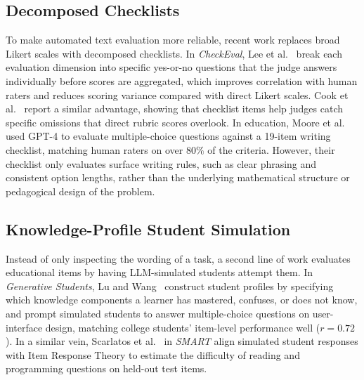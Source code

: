 \subsection{Decomposed Checklists}
\label{subsec:bg-eval-checklists}
To make automated text evaluation more reliable, recent work replaces broad Likert scales with decomposed checklists. In \emph{CheckEval}, Lee et al.~\cite{lee2025checkeval} break each evaluation dimension into specific yes-or-no questions that the judge answers individually before scores are aggregated, which improves correlation with human raters and reduces scoring variance compared with direct Likert scales. Cook et al.~\cite{cook2024tick} report a similar advantage, showing that checklist items help judges catch specific omissions that direct rubric scores overlook. In education, Moore et al.~\cite{moore2023mcqquality} used GPT-4 to evaluate multiple-choice questions against a 19-item writing checklist, matching human raters on over $80\%$ of the criteria. However, their checklist only evaluates surface writing rules, such as clear phrasing and consistent option lengths, rather than the underlying mathematical structure or pedagogical design of the problem.

\subsection{Knowledge-Profile Student Simulation}
\label{subsec:bg-eval-simstudents-profile}
Instead of only inspecting the wording of a task, a second line of work evaluates educational items by having LLM-simulated students attempt them. In \emph{Generative Students}, Lu and Wang~\cite{lu2024} construct student profiles by specifying which knowledge components a learner has mastered, confuses, or does not know, and prompt simulated students to answer multiple-choice questions on user-interface design, matching college students' item-level performance well ($r = 0.72$). In a similar vein, Scarlatos et al.~\cite{scarlatos2025smart} in \emph{SMART} align simulated student responses with Item Response Theory to estimate the difficulty of reading and programming questions on held-out test items.

